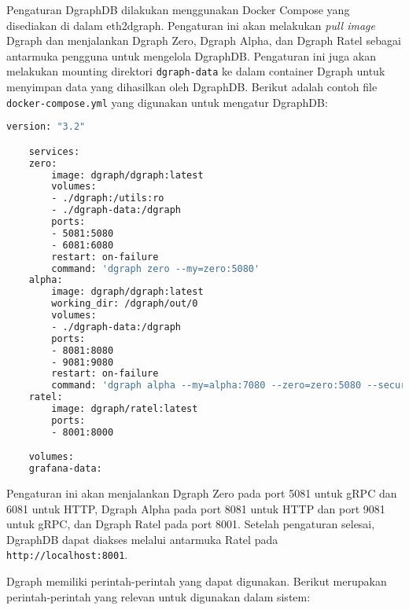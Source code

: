 Pengaturan DgraphDB dilakukan menggunakan Docker Compose yang disediakan di dalam eth2dgraph. Pengaturan ini akan melakukan \textit{pull image} Dgraph dan menjalankan Dgraph Zero, Dgraph Alpha, dan Dgraph Ratel sebagai antarmuka pengguna untuk mengelola DgraphDB. Pengaturan ini juga akan melakukan mounting direktori \texttt{dgraph-data} ke dalam container Dgraph untuk menyimpan data yang dihasilkan oleh DgraphDB. Berikut adalah contoh file \texttt{docker-compose.yml} yang digunakan untuk mengatur DgraphDB:

\begin{lstlisting}[language=bash]
    version: "3.2"

    services:
    zero:
        image: dgraph/dgraph:latest
        volumes:
        - ./dgraph:/utils:ro
        - ./dgraph-data:/dgraph
        ports:
        - 5081:5080
        - 6081:6080
        restart: on-failure
        command: 'dgraph zero --my=zero:5080'
    alpha:
        image: dgraph/dgraph:latest
        working_dir: /dgraph/out/0
        volumes:
        - ./dgraph-data:/dgraph
        ports:
        - 8081:8080
        - 9081:9080
        restart: on-failure
        command: 'dgraph alpha --my=alpha:7080 --zero=zero:5080 --security whitelist=0.0.0.0/0 --badger="compression=snappy; numgoroutines=64;" '
    ratel:
        image: dgraph/ratel:latest
        ports:
        - 8001:8000

    volumes:
    grafana-data:
\end{lstlisting}

Pengaturan ini akan menjalankan Dgraph Zero pada port 5081 untuk gRPC dan 6081 untuk HTTP, Dgraph Alpha pada port 8081 untuk HTTP dan port 9081 untuk gRPC, dan Dgraph Ratel pada port 8001. Setelah pengaturan selesai, DgraphDB dapat diakses melalui antarmuka Ratel pada \texttt{http://localhost:8001}.

Dgraph memiliki perintah-perintah yang dapat digunakan. Berikut merupakan perintah-perintah yang relevan untuk digunakan dalam sistem:

